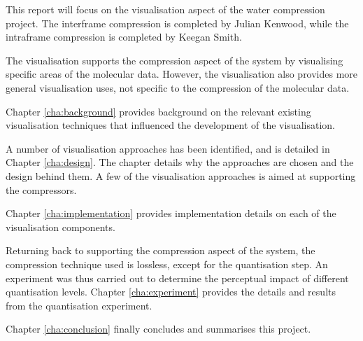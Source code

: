 This report will focus on the visualisation aspect of the water compression
project. The interframe compression is completed by Julian Kenwood, while the
intraframe compression is completed by Keegan Smith.

The visualisation supports the compression aspect of the system by visualising
specific areas of the molecular data.  However, the visualisation also provides
more general visualisation uses, not specific to the compression of the
molecular data.

Chapter \ref{cha:background} provides background on the relevant existing
visualisation techniques that influenced the development of the visualisation.

A number of visualisation approaches has been identified, and is detailed in
Chapter \ref{cha:design}. The chapter details why the approaches are chosen and
the design behind them. A few of the visualisation approaches is aimed at
supporting the compressors.

Chapter \ref{cha:implementation} provides implementation details on each of the
visualisation components.

Returning back to supporting the compression aspect of the system, the
compression technique used is lossless, except for the quantisation step. An
experiment was thus carried out to determine the perceptual impact of different
quantisation levels. Chapter \ref{cha:experiment} provides the details and
results from the quantisation experiment.

Chapter \ref{cha:conclusion} finally concludes and summarises this project.


